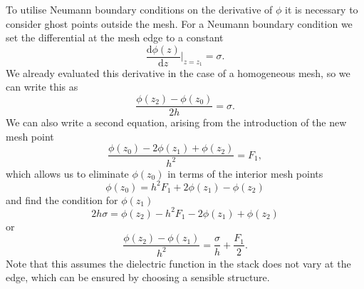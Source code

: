 \documentclass[reprint, amsmath,amssymb, aps]{revtex4-1}
\begin{document}
To utilise Neumann boundary conditions on the derivative of $\phi$ it is necessary to consider ghost points outside the mesh. For a Neumann boundary condition we set the differential at the mesh edge to a constant
\begin{equation}
	\frac{\mathrm{d} \phi \left(z\right)}{\mathrm{d} z} \biggr\vert_{z = z_1} = \sigma.
\end{equation}
We already evaluated this derivative in the case of a homogeneous mesh, so we can write this as
\begin{equation}
	\frac{\phi\left(z_{2}\right) - \phi\left(z_{0}\right)}{2 h} = \sigma.
\end{equation}
We can also write a second equation, arising from the introduction of the new mesh point
\begin{equation}
	\frac{\phi\left(z_0\right) - 2 \phi \left(z_1\right) + \phi \left(z_2\right)}{h^2} = F_1,
\end{equation}
which allows us to eliminate $\phi\left(z_0\right)$ in terms of the interior mesh points
\begin{equation}
	\phi\left(z_0\right) = h^2 F_1 + 2 \phi\left(z_1\right) - \phi\left(z_2\right)
\end{equation}
and find the condition for $\phi\left(z_1\right)$
\begin{equation}
	2 h \sigma = \phi\left(z_2\right) - h^2 F_1 - 2 \phi\left(z_1\right) + \phi\left(z_2\right)
\end{equation}
or
\begin{equation}
	\frac{\phi\left(z_2\right) - \phi\left(z_1\right)}{h^2} = \frac{\sigma}{h} + \frac{F_1}{2}.
\end{equation}
Note that this assumes the dielectric function in the stack does not vary at the edge, which can be ensured by choosing a sensible structure.
\end{document}
